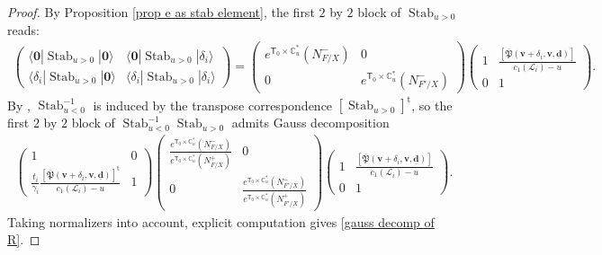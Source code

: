 \documentclass[10pt]{amsart}
\theoremstyle{definition}
\numberwithin{equation}{section}
\newcommand{\bC}{\mathbb{C}}
\newcommand{\bv}{\mathbf{v}}
\newcommand{\bd}{\mathbf{d}}
\newcommand{\sT}{\mathsf{T}}
\newcommand{\Stab}{\operatorname{Stab}}
\begin{document}
\begin{proof}
By Proposition \ref{prop e as stab element}, the first $2$ by $2$ block of $\Stab_{u>0}$ reads:
\begin{align*}
\begin{pmatrix}
\langle\mathbf 0|\Stab_{u>0}|\mathbf 0\rangle & \langle\mathbf 0|\Stab_{u>0}|\delta_i\rangle \\
\langle\delta_i|\Stab_{u>0}|\mathbf 0\rangle & \langle\delta_i|\Stab_{u>0}|\delta_i\rangle
\end{pmatrix}
=
\begin{pmatrix}
e^{\sT_0\times \bC^*_u}(N^-_{F/X}) & 0 \\
0 & e^{\sT_0\times \bC^*_u}(N^-_{F'/X}) 
\end{pmatrix}
\begin{pmatrix}
1 & \frac{[\overline{\mathfrak{P}}(\bv+\delta_i,\bv,\underline{\bd})]}{c_1(\mathcal L_i)-u}\\
0 & 1 
\end{pmatrix}.
\end{align*}
By \cite[Lem.~3.29]{COZZ}, $\Stab_{u<0}^{-1}$ is induced by the transpose correspondence $[\Stab_{u>0}]^{\mathrm{t}}$, so the first $2$ by $2$ block of $\Stab_{u<0}^{-1}\Stab_{u>0}$ admits Gauss decomposition
\begin{align*}
\begin{pmatrix}
1 & 0\\
\frac{t_i}{\gamma_i}\frac{[\overline{\mathfrak{P}}(\bv+\delta_i,\bv,\underline{\bd})]^{\mathrm{t}}}{c_1(\mathcal L_i)-u} & 1 
\end{pmatrix}
\begin{pmatrix}
\frac{e^{\sT_0\times \bC^*_u}(N^-_{F/X})}{e^{\sT_0\times \bC^*_u}(N^+_{F/X})} & 0 \\
0 & \frac{e^{\sT_0\times \bC^*_u}(N^-_{F'/X})}{e^{\sT_0\times \bC^*_u}(N^+_{F'/X})} 
\end{pmatrix}
\begin{pmatrix}
1 & \frac{[\overline{\mathfrak{P}}(\bv+\delta_i,\bv,\underline{\bd})]}{c_1(\mathcal L_i)-u}\\
0 & 1 
\end{pmatrix}.
\end{align*}
Taking normalizers into account, explicit computation gives \eqref{gauss decomp of R}.
\end{proof}
\end{document}
